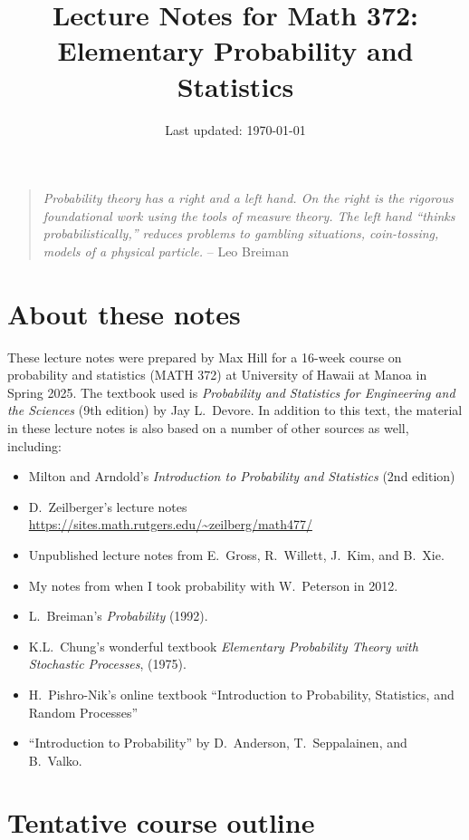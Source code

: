\documentclass[10pt]{article}
\title{Lecture Notes for Math 372: \\Elementary Probability and Statistics}
\date{Last updated: \today}
\theoremstyle{definition}
\newcommand{\1}[1]{\textbf{1}_{\left[#1\right]}} %
\begin{document}
\maketitle


\begin{quote}
  \textit{Probability theory has a right and a left hand. On the right is the rigorous foundational work using
    the tools of measure theory. The left hand ``thinks probabilistically,'' reduces problems to gambling
    situations, coin-tossing, models of a physical particle.} -- Leo Breiman
\end{quote}


\tableofcontents
\newpage
\section*{About these notes}

These lecture notes were prepared by Max Hill for a 16-week course on
probability and statistics (MATH 372) at University of Hawaii at Manoa in
Spring 2025. The textbook used is \textit{Probability and Statistics for
  Engineering and the Sciences} (9th edition) by Jay L.~Devore. In addition to
this text, the material in these lecture notes is also based on a number of
other sources as well, including:
\begin{itemize}
  \item Milton and Arndold's \textit{Introduction to Probability and Statistics} (2nd edition) 
  \item D.~Zeilberger's lecture notes \url{https://sites.math.rutgers.edu/~zeilberg/math477/}
  \item Unpublished lecture notes from E.~Gross, R.~Willett, J.~Kim, and B.~Xie.
  \item My notes from when I took probability with W.~Peterson in 2012.
  \item L.~Breiman's \textit{Probability} (1992).
  \item K.L.~Chung's wonderful textbook \textit{Elementary Probability Theory with Stochastic
    Processes}, (1975).
  \item H.~Pishro-Nik's online textbook ``Introduction to Probability,
  Statistics, and Random Processes''
  \item ``Introduction to Probability'' by D.~Anderson, T.~Seppalainen, and B.~Valko.
\end{itemize}
\newpage
\setcounter{section}{-1}
\section{Tentative course outline}
\end{document}
